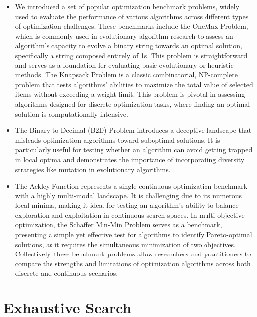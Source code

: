 \documentclass[
  letterpaper,
  DIV=11,
  numbers=noendperiod]{scrreprt}
\begin{document}
\begin{itemize}
\item
  We introduced a set of popular optimization benchmark problems, widely
  used to evaluate the performance of various algorithms across
  different types of optimization challenges. These benchmarks include
  the OneMax Problem, which is commonly used in evolutionary algorithm
  research to assess an algorithm's capacity to evolve a binary string
  towards an optimal solution, specifically a string composed entirely
  of 1s. This problem is straightforward and serves as a foundation for
  evaluating basic evolutionary or heuristic methods. The Knapsack
  Problem is a classic combinatorial, NP-complete problem that tests
  algorithms' abilities to maximize the total value of selected items
  without exceeding a weight limit. This problem is pivotal in assessing
  algorithms designed for discrete optimization tasks, where finding an
  optimal solution is computationally intensive.
\item
  The Binary-to-Decimal (B2D) Problem introduces a deceptive landscape
  that misleads optimization algorithms toward suboptimal solutions. It
  is particularly useful for testing whether an algorithm can avoid
  getting trapped in local optima and demonstrates the importance of
  incorporating diversity strategies like mutation in evolutionary
  algorithms.
\item
  The Ackley Function represents a single continuous optimization
  benchmark with a highly multi-modal landscape. It is challenging due
  to its numerous local minima, making it ideal for testing an
  algorithm's ability to balance exploration and exploitation in
  continuous search spaces. In multi-objective optimization, the
  Schaffer Min-Min Problem serves as a benchmark, presenting a simple
  yet effective test for algorithms to identify Pareto-optimal
  solutions, as it requires the simultaneous minimization of two
  objectives. Collectively, these benchmark problems allow researchers
  and practitioners to compare the strengths and limitations of
  optimization algorithms across both discrete and continuous scenarios.
\end{itemize}


\chapter{Exhaustive Search}\label{exhaustive-search}
\end{document}

